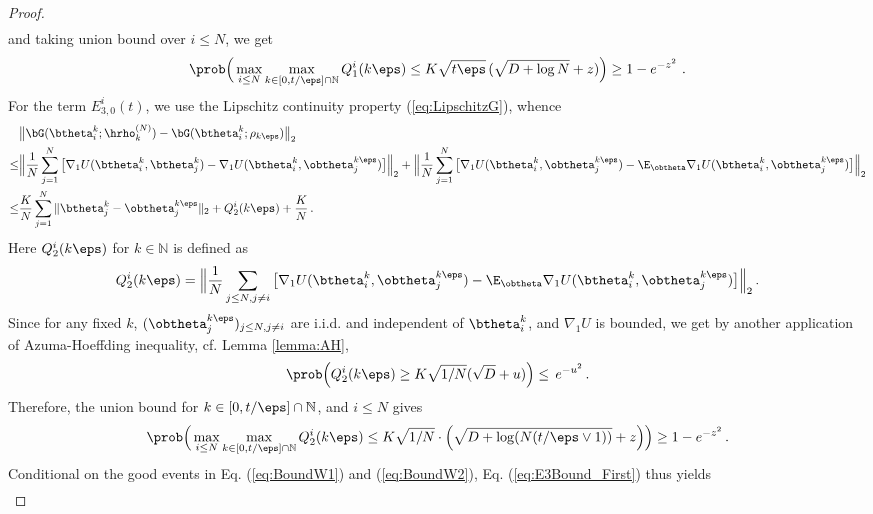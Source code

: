 \documentclass[11pt]{article}
\begin{document}
\begin{proof}
\begin{align}
\end{align}
and taking union bound over $i \le N$, we get
\begin{align}
\prob\Big(\max_{i \le N}\max_{k \in  [0, t/\eps] \cap \mathbb N} Q_1^i( k \eps)\le K\sqrt{t\eps}\, ( \sqrt{D + \log N} + z)\Big)\ge  1 - e^{-z^2}\, \,.\label{eq:BoundW1}
\end{align}
%
For the term $E_{3,0}^i(t)$, we use the Lipschitz continuity property (\ref{eq:LipschitzG}), whence
%
\begin{equation}
\begin{aligned}
%
&\big\|\bG(\btheta_i^{k};\hrho^{(N)}_{k})-\bG(\btheta_i^{k};\rho_{k\eps})\big\|_2\\
\le& \Big\|\frac{1}{N}\sum_{j=1}^N\big[\nabla_1 U(\btheta_i^{k},\btheta_j^k)-\nabla_1 U(\btheta_i^{k},\obtheta_j^{k\eps})\big]\Big\|_2 +\Big\|\frac{1}{N}\sum_{j=1}^N\big[\nabla_1 U(\btheta_i^{k},\obtheta_j^{k\eps})-\E_{\obtheta} \nabla_1 U(\btheta_i^{k},\obtheta_j^{k\eps})\big]\Big\|_2\\
\le& \frac{K}{N}\sum_{j=1}^N\|\btheta_j^k-\obtheta_j^{k\eps}\|_2+Q_2^i(k\eps)+\frac{K}{N}\, .
%
\end{aligned}
\end{equation}
%
Here $Q_2^i(k\eps)$ for $k \in \mathbb N $ is defined as
%
\begin{align*}
%
Q_2^i(k\eps) = \Big\|\frac{1}{N}\sum_{j \le N, j \neq i }\big[\nabla_1 U(\btheta_i^{k},\obtheta_j^{k\eps})-\E_{\obtheta} \nabla_1 U(\btheta_i^{k },\obtheta_j^{k\eps})\big]\Big\|_2\, .
%
\end{align*}
%
Since for any fixed $k$, $(\obtheta_j^{k\eps})_{j \le N, j \neq i}$ are i.i.d. and independent of $\btheta_i^{k}$, and $\nabla_1 U$ is bounded, we get by another application of Azuma-Hoeffding inequality, cf. Lemma \ref{lemma:AH}, 
%
\begin{align}
%
\prob \Big( Q_{2}^i(k\eps) \ge K \sqrt{1/N} (\sqrt{D} + u) \Big)\le \, e^{-u^2}\, .
%
\end{align}
%
Therefore, the union bound for $k \in  [0, t/\eps] \cap \mathbb N$, and $i \le N$ gives
\begin{align}
\prob\Big(\max_{i \le N} \max_{k \in  [0, t/\eps] \cap \mathbb N} Q_{2}^i(k \eps) \le K \sqrt{1/N} \cdot\Big(\sqrt{D + \log(N (t/\eps \vee 1))}+z\Big)\Big) \ge  1 -e^{-z^2}\,  . \label{eq:BoundW2}
\end{align}
%
Conditional on the good events in Eq. (\ref{eq:BoundW1}) and (\ref{eq:BoundW2}), Eq. (\ref{eq:E3Bound_First}) thus yields
\begin{align}

\end{align}
\end{proof}
\end{document}
